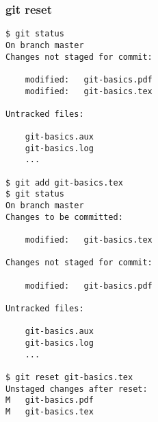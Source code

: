 \documentclass{beamer}
\begin{document}

\begin{frame}[fragile]
\frametitle{git reset}
	\tiny
	\begin{verbatim}
$ git status
On branch master
Changes not staged for commit:

	modified:   git-basics.pdf
	modified:   git-basics.tex

Untracked files:

	git-basics.aux
	git-basics.log
	...

$ git add git-basics.tex
$ git status
On branch master
Changes to be committed:

	modified:   git-basics.tex

Changes not staged for commit:

	modified:   git-basics.pdf

Untracked files:

	git-basics.aux
	git-basics.log
	...

$ git reset git-basics.tex
Unstaged changes after reset:
M	git-basics.pdf
M	git-basics.tex
	\end{verbatim}
\end{frame}
\end{document}
